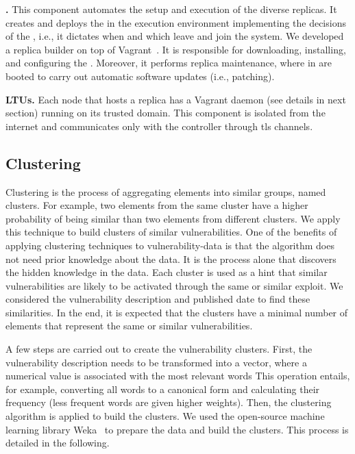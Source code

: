  \textbf{\manager.} 
This component automates the setup and execution of the diverse replicas. 
It creates and deploys the \replicas in the execution environment implementing the decisions of the \risk, i.e., it dictates when and which \replicas leave and join the system. 
We developed a replica builder on top of Vagrant~\cite{vagrant}.
It is responsible for downloading, installing, and configuring the \replicas.
Moreover, it performs replica maintenance, where \replicas in \QS are booted to carry out automatic software updates (i.e., patching). 


 \textbf{LTUs.} Each node that hosts a replica has a Vagrant daemon (see details in next section) running on its trusted domain.
This component is isolated from the internet and communicates only with the \system controller through \gls{tls} channels.



\subsection{Clustering}\label{sec:clustering}

Clustering is the process of aggregating elements into similar groups, named clusters. 
For example, two elements from the same cluster have a higher probability of being similar than two elements from different clusters. 
We apply this technique to build clusters of similar vulnerabilities.
One of the benefits of applying clustering techniques to vulnerability-data is that the algorithm does not need prior knowledge about the data.
It is the process alone that discovers the hidden knowledge in the data.
Each cluster is used as a hint that similar vulnerabilities are likely to be activated through the same or similar exploit.
We considered the vulnerability description and published date to find these similarities. 
In the end, it is expected that the clusters have a minimal number of elements that represent the same or similar vulnerabilities.


A few steps are carried out to create the vulnerability clusters. 
First, the vulnerability description needs to be transformed into a vector, where a numerical value is associated with the most relevant words 
This operation entails, for example, converting all words to a canonical form and calculating their frequency (less frequent words are given higher weights).
Then, the clustering algorithm is applied to build the clusters. 
We used the open-source machine learning library Weka~\cite{weka} to prepare the data and build the clusters. 
This process is detailed in the following.



